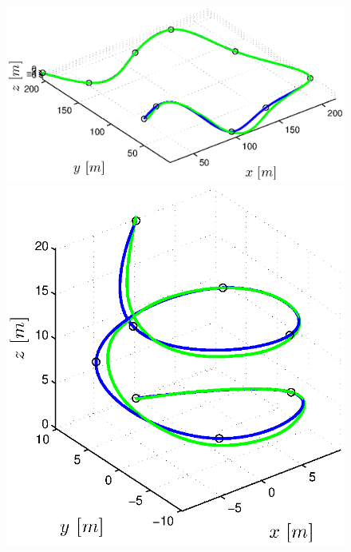 \begin{figure}[H]
  \begin{minipage}[t]{0.32\textwidth}
    \includegraphics[width = \textwidth]{trackings/figure_3D_road_SplineDegree3_trajectoryFollowing_Disturbance_1}
  \end{minipage}
  \hfill
  \begin{minipage}[t]{0.32\textwidth}
    \includegraphics[width = \textwidth]{trackings/figure_3D_helix_SplineDegree3_trajectoryFollowing_Disturbance_1}
  \end{minipage}
  \hfill
  \begin{minipage}[t]{0.32\textwidth}

\end{minipage}
\end{figure}
